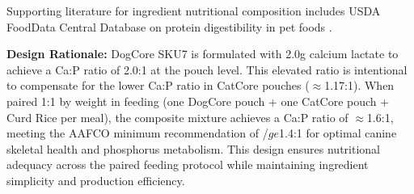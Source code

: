 Supporting literature for ingredient nutritional composition includes USDA FoodData Central Database on protein digestibility in pet foods \cite{USDA_FoodData_Central,Swanson2013}.

\vspace{1em}
\noindent\textbf{Design Rationale:} DogCore SKU7 is formulated with 2.0g calcium lactate to achieve a Ca:P ratio of 2.0:1 at the pouch level. This elevated ratio is intentional to compensate for the lower Ca:P ratio in CatCore pouches ($\approx$1.17:1). When paired 1:1 by weight in feeding (one DogCore pouch + one CatCore pouch + Curd Rice per meal), the composite mixture achieves a Ca:P ratio of $\approx$1.6:1, meeting the AAFCO minimum recommendation of /$ge$1.4:1 for optimal canine skeletal health and phosphorus metabolism. This design ensures nutritional adequacy across the paired feeding protocol while maintaining ingredient simplicity and production efficiency.